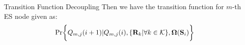 \documentclass[10pt, conference, letterpaper]{IEEEtran}
\newcommand{\mat}{\mathbf}
\DeclarePairedDelimiter{\set}{\{}{\}}
\DeclarePairedDelimiter{\Brace}{\bigg\{}{\bigg\}}
\newcommand{\apSet}{\mathcal{K}}
\newcommand{\Stat}{\mathbf{S}}
\newcommand{\Policy}{\mathbf{\Omega}}
\begin{document}
\begin{section}{Transition Function Decoupling}
        Then we have the transition function for $m$-th ES node given as:
        \begin{align*}
            & \Pr\Brace{Q_{m,j}(i+1)|Q_{m,j}(i), \set{\mat{R}_{k}|\forall k\in\apSet}, \Policy(\Stat_i)}
        \end{align*}
    \end{section}
    
    
    
\end{document}
